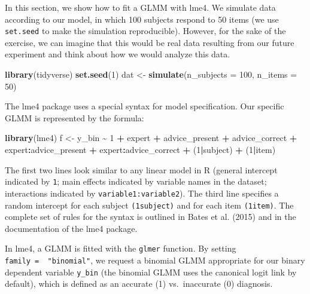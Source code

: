 \documentclass[
  man,floatsintext]{apa6}
\newenvironment{Shaded}{\begin{snugshade}}{\end{snugshade}}
\newcommand{\AttributeTok}[1]{\textcolor[rgb]{0.13,0.29,0.53}{#1}}
\newcommand{\DecValTok}[1]{\textcolor[rgb]{0.00,0.00,0.81}{#1}}
\newcommand{\FunctionTok}[1]{\textcolor[rgb]{0.13,0.29,0.53}{\textbf{#1}}}
\newcommand{\NormalTok}[1]{#1}
\newcommand{\OtherTok}[1]{\textcolor[rgb]{0.56,0.35,0.01}{#1}}
\newcommand{\SpecialCharTok}[1]{\textcolor[rgb]{0.81,0.36,0.00}{\textbf{#1}}}
\begin{document}
In this section, we show how to fit a GLMM with lme4.
We simulate data according to our model, in which 100 subjects respond to 50 items (we use \texttt{set.seed} to make the simulation reproducible). However, for the sake of the exercise, we can imagine that this would be real data resulting from our future experiment and think about how we would analyze this data.

\begin{Shaded}
\begin{Highlighting}[]
\FunctionTok{library}\NormalTok{(tidyverse)}
\FunctionTok{set.seed}\NormalTok{(}\DecValTok{1}\NormalTok{)}
\NormalTok{dat }\OtherTok{\textless{}{-}} \FunctionTok{simulate}\NormalTok{(}\AttributeTok{n\_subjects =} \DecValTok{100}\NormalTok{, }\AttributeTok{n\_items =} \DecValTok{50}\NormalTok{)}
\end{Highlighting}
\end{Shaded}

The lme4 package uses a special syntax for model specification. Our specific GLMM is represented by the formula:

\begin{Shaded}
\begin{Highlighting}[]
\FunctionTok{library}\NormalTok{(lme4)}
\NormalTok{f }\OtherTok{\textless{}{-}}\NormalTok{ y\_bin }\SpecialCharTok{\textasciitilde{}} \DecValTok{1} \SpecialCharTok{+}\NormalTok{ expert }\SpecialCharTok{+}\NormalTok{ advice\_present }\SpecialCharTok{+}\NormalTok{ advice\_correct }\SpecialCharTok{+} 
\NormalTok{  expert}\SpecialCharTok{:}\NormalTok{advice\_present }\SpecialCharTok{+}\NormalTok{ expert}\SpecialCharTok{:}\NormalTok{advice\_correct }\SpecialCharTok{+}
\NormalTok{  (}\DecValTok{1}\SpecialCharTok{|}\NormalTok{subject) }\SpecialCharTok{+}\NormalTok{ (}\DecValTok{1}\SpecialCharTok{|}\NormalTok{item)}
\end{Highlighting}
\end{Shaded}

The first two lines look similar to any linear model in R (general intercept indicated by \texttt{1}; main effects indicated by variable names in the dataset; interactions indicated by \texttt{variable1:variable2}). The third line specifies a random intercept for each subject \texttt{(1\textbar{}subject)} and for each item \texttt{(1\textbar{}item)}. The complete set of rules for the syntax is outlined in Bates et al. (2015) and in the documentation of the lme4 package.

In lme4, a GLMM is fitted with the \texttt{glmer} function. By setting \texttt{family\ =\ \ "binomial"}, we request a binomial GLMM appropriate for our binary dependent variable \texttt{y\_bin} (the binomial GLMM uses the canonical logit link by default), which is defined as an accurate (1) vs.~inaccurate (0) diagnosis.
\end{document}
